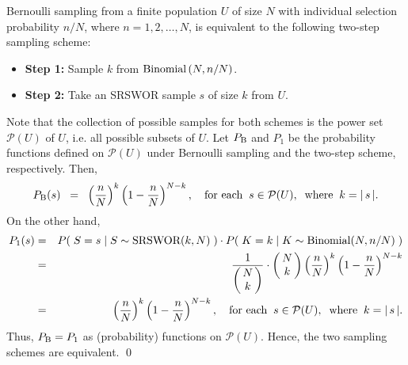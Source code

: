 \begin{lemma}
\mbox{}
\vskip 0.1cm
\noindent
Bernoulli sampling from a finite population $U$ of size $N$ with individual selection probability $n/N$, where $n = 1,2,\ldots,N$, is equivalent to the following two-step sampling scheme:
\begin{itemize}
\item	\textbf{Step 1:} Sample $k$ from $\textnormal{Binomial}\left(N,n/N\right)$.
\item	\textbf{Step 2:} Take an SRSWOR sample $s$ of size $k$ from $U$.
\end{itemize}
\end{lemma}
\proof
Note that the collection of possible samples for both schemes is the power set $\mathcal{P}(U)$ of $U$,
i.e. all possible subsets of $U$. Let $P_{\textnormal{B}}$ and $P_{1}$ be the probability functions defined
on $\mathcal{P}(U)$ under Bernoulli sampling and the two-step scheme, respectively. Then,
\begin{equation*}
P_{\textnormal{B}}(s) \;\;=\;\; \left(\dfrac{n}{N}\right)^{k} \left(1 - \dfrac{n}{N}\right)^{N-k},
\quad\textnormal{for each}\;\; s \in \mathcal{P}(U), \;\;\textnormal{where}\;\; k = \vert\,s\,\vert.
\end{equation*}
On the other hand,
\begin{eqnarray*}
P_{1}(s)
&=& P\!\left(\;S = s\;\vert\;S \sim \textnormal{SRSWOR}(k,N)\;\right) \cdot
P\!\left(\;K = k\;\vert\; K \sim \textnormal{Binomial}(N,n/N)\;\right)
\\
& = & \dfrac{1}{\left(\!\!\begin{array}{c} N \\ k \end{array}\!\!\right)} \cdot \left(\!\!\begin{array}{c} N \\ k \end{array}\!\!\right)\left(\dfrac{n}{N}\right)^{k} \left(1 - \dfrac{n}{N}\right)^{N-k}
\\
& = & \left(\dfrac{n}{N}\right)^{k} \left(1 - \dfrac{n}{N}\right)^{N-k},
\quad\textnormal{for each}\;\; s \in \mathcal{P}(U), \;\;\textnormal{where}\;\; k = \vert\,s\,\vert.
\end{eqnarray*}
Thus, $P_{\textnormal{B}} = P_{1}$ as (probability) functions on $\mathcal{P}(U)$.
Hence, the two sampling schemes are equivalent.
\qed

